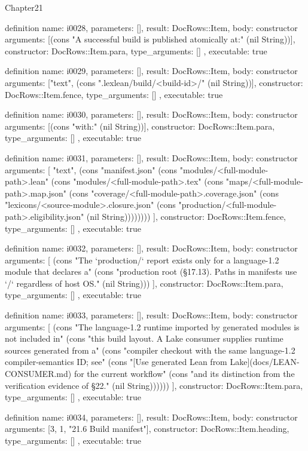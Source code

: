\begin{lexlean}{Chapter21}
\begin{semanticmodule}
definition{
  name: i0028,
  parameters: [],
  result: DocRows::Item,
  body: constructor{
    arguments: [(cons "A successful build is published atomically at:" (nil String))],
    constructor: DocRows::Item.para,
    type_arguments: []
  },
  executable: true
}

definition{
  name: i0029,
  parameters: [],
  result: DocRows::Item,
  body: constructor{
    arguments: ["text", (cons ".lexlean/build/<build-id>/" (nil String))],
    constructor: DocRows::Item.fence,
    type_arguments: []
  },
  executable: true
}

definition{
  name: i0030,
  parameters: [],
  result: DocRows::Item,
  body: constructor{
    arguments: [(cons "with:" (nil String))],
    constructor: DocRows::Item.para,
    type_arguments: []
  },
  executable: true
}

definition{
  name: i0031,
  parameters: [],
  result: DocRows::Item,
  body: constructor{
    arguments: [
      "text",
      (cons "manifest.json" (cons "modules/<full-module-path>.lean" (cons "modules/<full-module-path>.tex" (cons "maps/<full-module-path>.map.json" (cons "coverage/<full-module-path>.coverage.json" (cons "lexicons/<source-module>.closure.json" (cons "production/<full-module-path>.eligibility.json" (nil String))))))))
    ],
    constructor: DocRows::Item.fence,
    type_arguments: []
  },
  executable: true
}

definition{
  name: i0032,
  parameters: [],
  result: DocRows::Item,
  body: constructor{
    arguments: [
      (cons "The `production/` report exists only for a language-1.2 module that declares a" (cons "production root (§17.13). Paths in manifests use `/` regardless of host OS." (nil String)))
    ],
    constructor: DocRows::Item.para,
    type_arguments: []
  },
  executable: true
}

definition{
  name: i0033,
  parameters: [],
  result: DocRows::Item,
  body: constructor{
    arguments: [
      (cons "The language-1.2 runtime imported by generated modules is not included in" (cons "this build layout. A Lake consumer supplies runtime sources generated from a" (cons "compiler checkout with the same language-1.2 compiler-semantics ID; see" (cons "[Use generated Lean from Lake](docs/LEAN-CONSUMER.md) for the current workflow" (cons "and its distinction from the verification evidence of §22." (nil String))))))
    ],
    constructor: DocRows::Item.para,
    type_arguments: []
  },
  executable: true
}

definition{
  name: i0034,
  parameters: [],
  result: DocRows::Item,
  body: constructor{
    arguments: [3, 1, "21.6 Build manifest"],
    constructor: DocRows::Item.heading,
    type_arguments: []
  },
  executable: true
}


\end{semanticmodule}
\end{lexlean}
